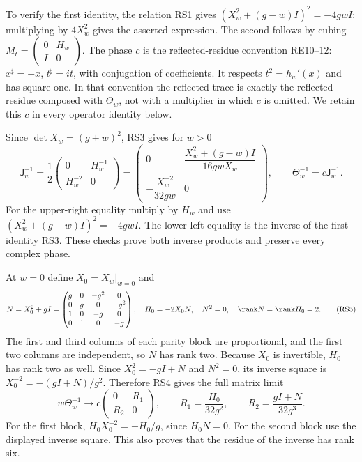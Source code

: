 To verify the first identity, the relation RS1 gives
$(X_w^2+(g-w)I)^2=-4gwI$; multiplying by $4X_w^2$
gives the asserted expression. The second follows by cubing
$M_t=\left(\begin{smallmatrix}0&H_w\\I&0\end{smallmatrix}\right)$.
The phase $c$ is the reflected-residue convention RE10--12:
$x^\sharp=-x$, $t^\sharp=it$, with conjugation of coefficients.
It respects $t^2=h_w'(x)$ and has square one. In that convention
the reflected trace is exactly the reflected residue composed
with $\Theta_w$, not with a multiplier in which $c$ is omitted.
We retain this $c$ in every operator identity below.

Since $\det X_w=(g+w)^2$, RS3 gives for $w>0$
\begin{equation}
 \mathsf J_w^{-1}
 =\frac12\begin{pmatrix}0&H_w^{-1}\\H_w^{-2}&0\end{pmatrix}
 =\begin{pmatrix}
 0&\dfrac{X_w^2+(g-w)I}{16gwX_w}\\[4pt]
 -\dfrac{X_w^{-2}}{32gw}&0
 \end{pmatrix},\qquad
 \Theta_w^{-1}=c\mathsf J_w^{-1}.
 \tag{RS4}
\end{equation}
For the upper-right equality multiply by $H_w$ and use
$(X_w^2+(g-w)I)^2=-4gwI$. The lower-left equality is the
inverse of the first identity RS3. These checks prove both
inverse products and preserve every complex phase.

At $w=0$ define $X_0=X_w|_{w=0}$ and
\begin{equation}
 N=X_0^2+gI=
 \begin{pmatrix}g&0&-g^2&0\\0&g&0&-g^2\\1&0&-g&0\\0&1&0&-g\end{pmatrix},
 \quad H_0=-2X_0N,\quad
 N^2=0,\quad\rank N=\rank H_0=2.
 \tag{RS5}
\end{equation}
The first and third columns of each parity block are proportional,
and the first two columns are independent, so $N$ has rank two.
Because $X_0$ is invertible, $H_0$ has rank two as well.
Since $X_0^2=-gI+N$ and $N^2=0$, its inverse square is
$X_0^{-2}=-(gI+N)/g^2$. Therefore RS4 gives the full matrix limit
\begin{equation}
 w\Theta_w^{-1}\longrightarrow
 c\begin{pmatrix}0&R_1\\R_2&0\end{pmatrix},\qquad
 R_1=\frac{H_0}{32g^2},\qquad R_2=\frac{gI+N}{32g^3}.
 \tag{RS6}
\end{equation}
For the first block, $H_0X_0^{-2}=-H_0/g$, since $H_0N=0$.
For the second block use the displayed inverse square. This also
proves that the residue of the inverse has rank six.

